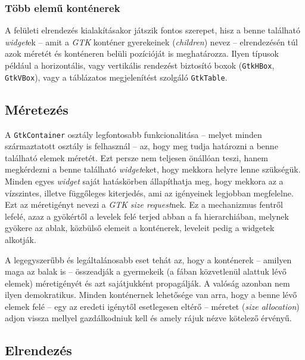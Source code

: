 \subsubsection{Több elemű konténerek}

A felületi elrendezés kialakításakor játszik fontos szerepet, hisz a benne található \textit{widget}ek -- amit a \textit{GTK} konténer gyerekeinek (\textit{children}) nevez -- elrendezésén túl azok méretét és konténeren belüli pozícióját is meghatározza. Ilyen típusok például a horizontális, vagy vertikális rendezést biztosító boxok (\texttt{GtkHBox}, \texttt{GtkVBox}), vagy a táblázatos megjelenítést szolgáló \texttt{GtkTable}.

\subsection{Méretezés}

\label{par:widgetsizerequest}
A \texttt{GtkContainer} osztály legfontosabb funkcionalitása -- melyet minden származtatott osztály is felhasznál -- az, hogy meg tudja határozni a benne található elemek méretét. Ezt persze nem teljesen önállóan teszi, hanem megkérdezni a benne található \textit{widget}eket, hogy mekkora helyre lenne szükségük. Minden egyes \textit{widget} saját hatáskörben állapíthatja meg, hogy mekkora az a vízszintes, illetve függőleges kiterjedés, ami az igényeinek legjobban megfelelne. Ezt az méretigényt nevezi a \textit{GTK} \textit{size request}nek. Ez a mechanizmus fentről lefelé, azaz a gyökértől a levelek felé terjed abban a fa hierarchiában, melynek gyökere az ablak, közbülső elemeit a konténerek, leveleit pedig a widgetek alkotják.

\label{par:widgetsizeallocation}
A legegyszerűbb és legáltalánosabb eset tehát az, hogy a konténerek -- amilyen maga az balak is -- összeadják a gyermekeik (a fában közvetlenül alattuk lévő elemek) méretigényét és azt sajátjukként propagálják. A valóság azonban nem ilyen demokratikus. Minden konténernek lehetősége van arra, hogy a benne lévő elemek felé -- egy az eredeti igénytől esetlegesen eltérő -- méretet (\textit{size allocation}) adjon vissza mellyel gazdálkodniuk kell és amely rájuk nézve kötelező érvényű.

\subsection{Elrendezés}


